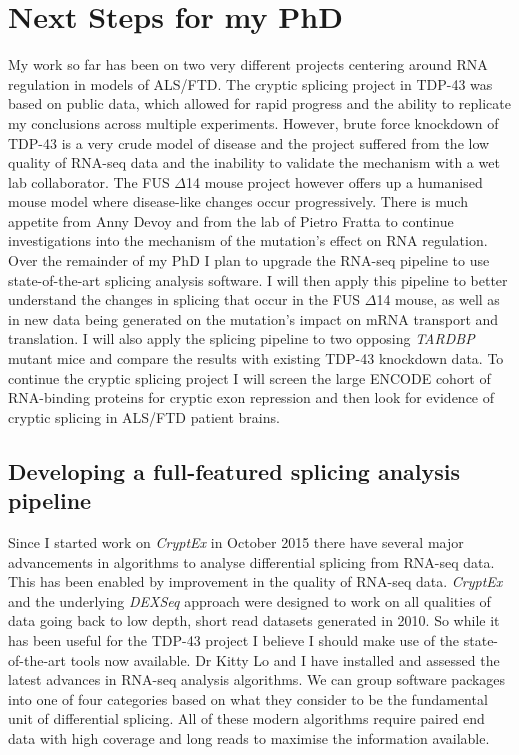 \chapter{Next Steps for my PhD}

My work so far has been on two very different projects centering around RNA regulation in models of ALS/FTD. The cryptic splicing project in TDP-43 was based on public data, which allowed for rapid progress and the ability to replicate my conclusions across multiple experiments. However, brute force knockdown of TDP-43 is a very crude model of disease and the project suffered from the low quality of RNA-seq data and the inability to validate the mechanism with a wet lab collaborator. The FUS $\Delta$14 mouse project however offers up a humanised mouse model where disease-like changes occur progressively. There is much appetite from Anny Devoy and from the lab of Pietro Fratta to continue investigations into the mechanism of the mutation's effect on RNA regulation.\\ 

Over the remainder of my PhD I plan to upgrade the RNA-seq pipeline to use state-of-the-art splicing analysis software. I will then apply this pipeline to better understand the changes in splicing that occur in the FUS $\Delta$14 mouse, as well as in new data being generated on the mutation's impact on mRNA transport and translation. I will also apply the splicing pipeline to two opposing \textit{TARDBP} mutant mice and compare the results with existing TDP-43 knockdown data. To continue the cryptic splicing project I will screen the large ENCODE cohort of RNA-binding proteins for cryptic exon repression and then look for evidence of cryptic splicing in ALS/FTD patient brains. 
	

\section{Developing a full-featured splicing analysis pipeline}
Since I started work on \textit{CryptEx} in October 2015 there have several major advancements in algorithms to analyse differential splicing from RNA-seq data. This has been enabled by improvement in the quality of RNA-seq data. \textit{CryptEx} and the underlying \textit{DEXSeq} approach were designed to work on all qualities of data going back to low depth, short read datasets generated in 2010. So while it has been useful for the TDP-43 project I believe I should make use of the state-of-the-art tools now available. Dr Kitty Lo and I have installed and assessed the latest advances in RNA-seq analysis algorithms. We can group software packages into one of four categories based on what they consider to be the fundamental unit of differential splicing. All of these modern algorithms require paired end data with high coverage and long reads to maximise the information available.

